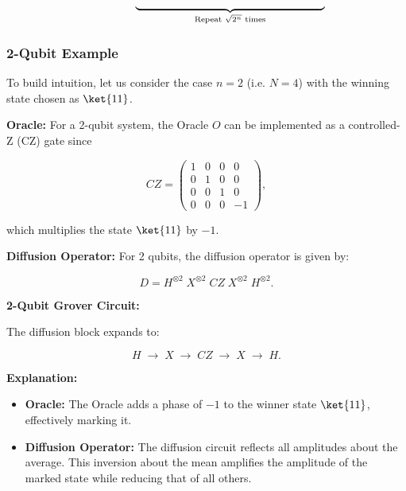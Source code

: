 \[
  \hspace{1.5cm}
  \underbrace{\hspace{6cm}}_{\text{Repeat } \sqrt{2^n} \text{ times}}
\]

\subsubsection*{2-Qubit Example}

To build intuition, let us consider the case \( n=2 \) (i.e. \( N=4 \)) with
the winning state chosen as \(\ket{11}\).

\vspace{0.3cm}

\textbf{Oracle:} For a 2-qubit system, the Oracle \(O\) can be implemented as
a controlled-Z (CZ) gate since

\[
  CZ =
  \begin{pmatrix}
    1 & 0 & 0 & 0 \\
    0 & 1 & 0 & 0 \\
    0 & 0 & 1 & 0 \\
    0 & 0 & 0 & -1
  \end{pmatrix},
\]

which multiplies the state \(\ket{11}\) by \(-1\).

\vspace{0.3cm}

\textbf{Diffusion Operator:} For 2 qubits, the diffusion operator is given by:

\[
  D = H^{\otimes 2}\; X^{\otimes 2}\; CZ\; X^{\otimes 2}\; H^{\otimes 2}.
\]

\textbf{2-Qubit Grover Circuit:}



The diffusion block expands to:

\[
  H \; \rightarrow \; X \; \rightarrow \; CZ \; \rightarrow \; X \;
  \rightarrow \; H.
\]

\textbf{Explanation:}

\begin{itemize}
  \item \textbf{Oracle:} The Oracle adds a phase of \(-1\) to the winner
    state \(\ket{11}\), effectively marking it.

  \item \textbf{Diffusion Operator:} The diffusion circuit reflects all
    amplitudes about the average. This inversion about the mean amplifies the
    amplitude of the marked state while reducing that of all others.

\end{itemize}

